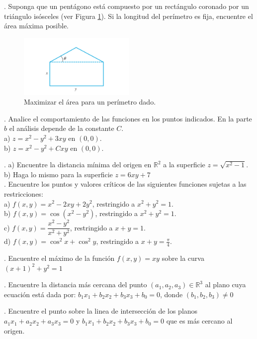 \documentclass[letterpaper]{article}
\renewcommand{\*}{\cdot}
\theoremstyle{definition}
\begin{document}
. Suponga que un pentágono está compuesto por un rectángulo coronado por un triángulo isósceles (ver Figura \ref{fig:1}). Si la longitud del perímetro es fija, encuentre el área máxima posible.

\begin{figure}[h]
    \centering
    \includegraphics[width=0.5\textwidth]{img/figT}
    \caption{Maximizar el área para un perímetro dado.}
    \label{fig:1}
\end{figure}


. Analice el comportamiento de las funciones en los puntos indicados. En la parte $b$ el análisis depende de la constante $C$.\\


a) $z = x^2 - y^2 + 3xy $ en $(0,0)$.\\
b)  $z = x^2 - y^2 + Cxy $ en $(0,0)$.




. a) Encuentre la distancia mínima del origen en $\mathbb{R}^2$  a la superficie $z = \sqrt{x^2 - 1}$.\\

b) Haga lo mismo para la superficie $z = 6xy + 7$\\

. Encuentre los puntos y valores críticos de las siguientes funciones sujetas a las restricciones:\\


a) $f(x,y) = x^2 - 2xy + 2y^2$, restringido a $x^2 + y^2 =1$.\\

b) $f(x,y) = \cos{(x^2 - y^2)}{}$, restringido a $x^2 + y^2 =1$.\\

c) $f(x,y) = \dfrac{x^2 - y^2}{x^2 + y^2}$, restringido a $x + y =1$.\\

d) $f(x,y) = \cos^2{x} +\cos^2{y}$, restringido a $x + y =\frac{\pi}{4}$.


. Encuentre el máximo de la función $f(x,y) = xy$ sobre la curva $(x +1)^2 + y^2 =1$

. Encuentre la distancia más cercana del punto $(a_1, a_2, a_3) \in \mathbb{R}^3$ al plano cuya ecuación está dada por: $b_1x_1 + b_2x_2 + b_3x_3 + b_0 = 0$, donde $(b_1, b_2, b_3) \neq 0 $

. Encuentre el punto sobre la linea de intersección de los planos  $a_1x_1 + a_2x_2 + a_3x_3 = 0$ y $b_1x_1 + b_2x_2 + b_3x_3 + b_0 = 0$ que es más cercano al origen.
\end{document}
